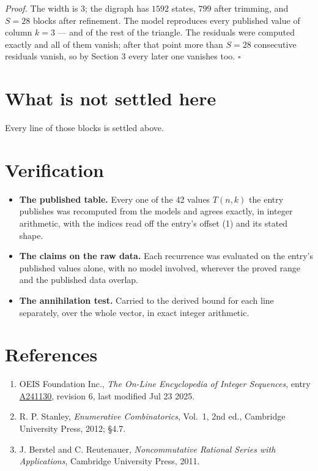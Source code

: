 \documentclass[11pt]{article}
\theoremstyle{definition}
\begin{document}
{\itshape Proof.} The width is $3$; the digraph has $1592$ states, $799$ after trimming, and $S = 28$ blocks after refinement. The model reproduces every published value of column $k = 3$ --- and of the rest of the triangle. The residuals were computed exactly and all of them vanish; after that point more than $S = 28$ consecutive residuals vanish, so by Section 3 every later one vanishes too. $\square$

\section{What is not settled here}

Every line of those blocks is settled above.

\section{Verification}

\begin{itemize}

\item {\bfseries The published table.} Every one of the 42 values $T(n,k)$ the entry publishes was recomputed from the models and agrees exactly, in integer arithmetic, with the indices read off the entry's offset (1) and its stated shape.

\item {\bfseries The claims on the raw data.} Each recurrence was evaluated on the entry's published values alone, with no model involved, wherever the proved range and the published data overlap.

\item {\bfseries The annihilation test.} Carried to the derived bound for each line separately, over the whole vector, in exact integer arithmetic.

\end{itemize}

\section{References}

\begin{enumerate}

\item OEIS Foundation Inc., \emph{The On-Line Encyclopedia of Integer Sequences}, entry \href{https://oeis.org/A241130}{A241130}, revision 6, last modified Jul 23 2025.

\item R. P. Stanley, \emph{Enumerative Combinatorics}, Vol.~1, 2nd ed., Cambridge University Press, 2012; \S4.7.

\item J. Berstel and C. Reutenauer, \emph{Noncommutative Rational Series with Applications}, Cambridge University Press, 2011.

\end{enumerate}
\end{document}
